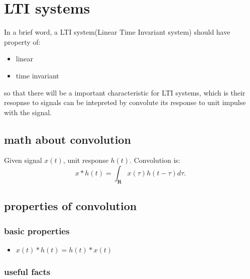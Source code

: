 \documentclass[11pt]{article}
\author{unknown}
\date{\today}
\title{}
\begin{document}
\tableofcontents

\section{LTI systems}
\label{sec:org1045066}

In a brief word, a LTI system(Linear Time Invariant system) should have property of:
\begin{itemize}
\item linear
\item time invariant
\end{itemize}
so that there will be a important characteristic for LTI systems, which is their resopnse to signals can be intepreted by convolute its response to unit impulse with the signal.
\subsection{math about convolution}
\label{sec:org56ca330}

Given signal $x(t)$, unit response $h(t)$. Convolution is: 
\begin{equation}
  x * h(t) = \int_{\mathbf{R}}x(\tau)h(t-\tau)d\tau.
\end{equation}
\subsection{properties of convolution}
\label{sec:orgb8a3d8b}
\subsubsection{basic properties}
\label{sec:org69849ef}

\begin{itemize}
\item \(x(t)*h(t) = h(t)*x(t)\)
\end{itemize}
\subsubsection{useful facts}
\label{sec:org3e9a11c}
\end{document}
